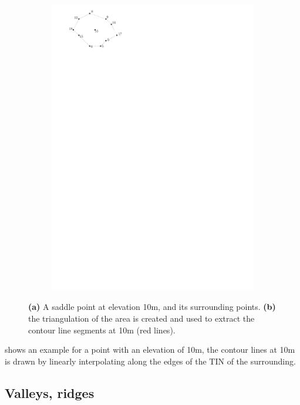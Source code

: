 \begin{figure}
\begin{subfigure}[b]{0.4\linewidth}
    \includegraphics[page=2,width=\textwidth]{figs/saddle_contour}
    \caption{}
  \end{subfigure}
\caption{\textbf{(a)} A saddle point at elevation 10m, and its surrounding points. \textbf{(b)} the triangulation of the area is created and used to extract the contour line segments at 10m (red lines).}
\label{fig:saddle_contour}
\end{figure}
shows an example for a point with an elevation of 10m, the contour lines at 10m is drawn by linearly interpolating along the edges of the TIN of the surrounding.



\subsection{Valleys, ridges}

